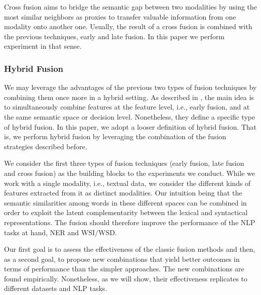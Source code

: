\documentclass{llncs}
\begin{document}
Cross fusion aims to bridge the semantic gap between two modalities by using the most similar neighbors as proxies to transfer valuable information  from one modality onto another one. Usually, the result of a cross fusion is combined with the previous techniques, early and late fusion. In this paper we perform  experiment in that sense.

\subsubsection{Hybrid Fusion}
We may leverage the advantages of the previous two types of fusion techniques by combining them once more in a hybrid setting. As described in \cite{AtreyHEK10,yu2014informedia}, the main idea is to simultaneously combine features at the feature level, i.e., early fusion, and at the same semantic space or decision level. Nonetheless, they define a specific type of hybrid fusion. In this paper, we adopt a looser definition of hybrid fusion. That is, we perform hybrid fusion by leveraging the combination of the fusion strategies described before.

We consider the first three types of fusion techniques (early fusion, late fusion and cross fusion) as the building blocks to the experiments we conduct.  While we work with a single modality, i.e., textual data, we consider the different kinds of features extracted from it as distinct modalities. Our intuition being that the semantic similarities among words in these different spaces can be combined in order to exploit the latent complementarity between the lexical and syntactical representations. The fusion should therefore improve the performance of the NLP tasks at hand, NER and WSI/WSD.

Our first goal is to assess the effectiveness of the classic fusion methods and then, as a second goal, to propose new combinations that yield better outcomes in terms of performance than the simpler approaches. The new combinations are found empirically. Nonetheless, as we will show, their effectiveness replicates to different datasets and NLP tasks. 
%
%
\end{document}

